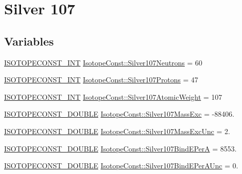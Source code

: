 \hypertarget{group___isotope_const-_silver-_ag107}{}\section{Silver 107}
\label{group___isotope_const-_silver-_ag107}
\subsection*{Variables}
\begin{DoxyCompactItemize}
\item 
\mbox{\hyperlink{group___isotope_const-_macros_ga5f18360b3e99483a35c32d789e62621c}{I\+S\+O\+T\+O\+P\+E\+C\+O\+N\+S\+T\+\_\+\+I\+NT}} \mbox{\hyperlink{group___isotope_const-_silver-_ag107_ga311c656f2a336d8c2a8ab659834ec27a}{Isotope\+Const\+::\+Silver107\+Neutrons}} = 60
\item 
\mbox{\hyperlink{group___isotope_const-_macros_ga5f18360b3e99483a35c32d789e62621c}{I\+S\+O\+T\+O\+P\+E\+C\+O\+N\+S\+T\+\_\+\+I\+NT}} \mbox{\hyperlink{group___isotope_const-_silver-_ag107_gac62850ca019dcaee0caa54d03f8ced59}{Isotope\+Const\+::\+Silver107\+Protons}} = 47
\item 
\mbox{\hyperlink{group___isotope_const-_macros_ga5f18360b3e99483a35c32d789e62621c}{I\+S\+O\+T\+O\+P\+E\+C\+O\+N\+S\+T\+\_\+\+I\+NT}} \mbox{\hyperlink{group___isotope_const-_silver-_ag107_ga134591111e08dd77e3bae05e431b7b84}{Isotope\+Const\+::\+Silver107\+Atomic\+Weight}} = 107
\item 
\mbox{\hyperlink{group___isotope_const-_macros_ga8f45a7272ce02c0b4c65c44636ed719a}{I\+S\+O\+T\+O\+P\+E\+C\+O\+N\+S\+T\+\_\+\+D\+O\+U\+B\+LE}} \mbox{\hyperlink{group___isotope_const-_silver-_ag107_ga113fca13777f14cc25fe2c776ccbaefc}{Isotope\+Const\+::\+Silver107\+Mass\+Exc}} = -\/88406.
\item 
\mbox{\hyperlink{group___isotope_const-_macros_ga8f45a7272ce02c0b4c65c44636ed719a}{I\+S\+O\+T\+O\+P\+E\+C\+O\+N\+S\+T\+\_\+\+D\+O\+U\+B\+LE}} \mbox{\hyperlink{group___isotope_const-_silver-_ag107_ga89707deee1f51b821b51b7a46c105ccc}{Isotope\+Const\+::\+Silver107\+Mass\+Exc\+Unc}} = 2.
\item 
\mbox{\hyperlink{group___isotope_const-_macros_ga8f45a7272ce02c0b4c65c44636ed719a}{I\+S\+O\+T\+O\+P\+E\+C\+O\+N\+S\+T\+\_\+\+D\+O\+U\+B\+LE}} \mbox{\hyperlink{group___isotope_const-_silver-_ag107_ga13ff3cb7b5726956257835ebeb85ef51}{Isotope\+Const\+::\+Silver107\+Bind\+E\+PerA}} = 8553.
\item 
\mbox{\hyperlink{group___isotope_const-_macros_ga8f45a7272ce02c0b4c65c44636ed719a}{I\+S\+O\+T\+O\+P\+E\+C\+O\+N\+S\+T\+\_\+\+D\+O\+U\+B\+LE}} \mbox{\hyperlink{group___isotope_const-_silver-_ag107_gab7d0131a050b788694efb86735844c96}{Isotope\+Const\+::\+Silver107\+Bind\+E\+Per\+A\+Unc}} = 0.

\end{DoxyCompactItemize}
